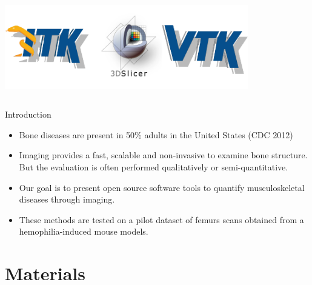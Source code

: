 \documentclass[10pt,aspectratio=169]{beamer}
\begin{document}
\begin{frame}
\begin{columns}[onlytextwidth]
    \includegraphics[width=0.9\textwidth]{./logos/kitware_itk_slicer_vtk_logos.png}
  \end{columns}

\end{frame}

\begin{frame}[fragile]{Introduction}
\begin{itemize} \itemsep1em
\item Bone diseases are present in 50\% adults in the United States (CDC 2012)

\item Imaging provides a fast, scalable and non-invasive to examine bone structure. But the evaluation is often performed qualitatively or semi-quantitative.

\item Our goal is to present open source software tools to quantify musculoskeletal diseases through imaging.

\item These methods are tested on a pilot dataset of femurs scans obtained from a hemophilia-induced mouse models.
\end{itemize}

\end{frame}

\section{Materials}
\end{document}
